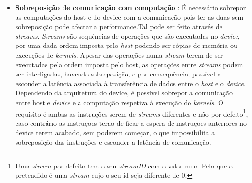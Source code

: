 \begin{itemize}
\item{\textbf{Sobreposição de comunicação com computação}} : 
É necessário sobrepor as computações do host e do device com a comunicação pois ter as duas sem sobreposição pode afectar a performance.Tal pode ser feito através de \textit{streams}. \textit{Streams} são sequências de operações que são executadas no \textit{device}, por uma dada ordem imposta pelo \textit{host}  podendo ser cópias de memória ou execuções de \textit{kernels}. Apesar das operações numa \textit{stream} terem de ser executadas pela ordem imposta pelo host, as operações entre \textit{streams} podem ser interligadas, havendo sobreposição, e por consequência, possível a esconder a latência associada à transferência de dados entre o \textit{host} e o \textit{device}. Dependendo da arquitetura do device, é possivel sobrepor a comunicação entre host e \textit{device} e a computação respetiva à execução do \textit{kernels}. O requisito é ambas as instruções serem de \textit{streams} diferentes e não por defeito\footnote[2]{Uma \textit{stream} por defeito tem o seu \textit{streamID} com o valor nulo. Pelo que o pretendido é uma \textit{stream} cujo o seu id seja diferente de 0. }, caso contrário as instruções terão de ficar à espera de instruções anteriores no device terem acabado, sem poderem começar, o que  impossibilita a sobreposição das instruções e esconder a latência de comunicação.


\end{itemize}
